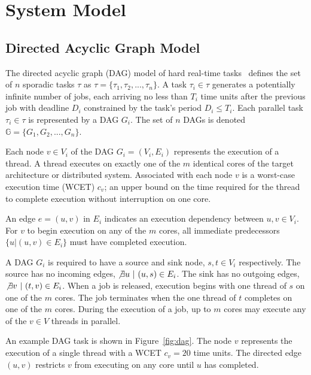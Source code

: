 \clearpage
\section{System Model}

\subsection{Directed Acyclic Graph Model}

The directed acyclic graph (DAG) model of hard real-time
tasks~\cite{li2014analysis} defines the set of ${n}$ sporadic tasks
${\tau}$ as ${\tau = \{\tau_1,\tau_2, ..., \tau_n\}}$. A task
${\tau_i \in \tau}$ generates a potentially infinite number
of jobs, each arriving no less than ${T_i}$ time units after the
previous job with deadline ${D_i}$ constrained by the task's period
${D_i \leq T_i}$. Each parallel task ${\tau_i \in \tau}$ is
represented by a DAG ${G_i}$. The set of ${n}$ DAGs is denoted
${\mathbb{G} = \{G_1, G_2, ..., G_n\}}$.

Each node ${v \in V_i}$ of the DAG ${G_i = (V_i, E_i)}$ represents the 
execution of a thread. A thread executes on exactly one of the ${m}$
identical cores of the target architecture or distributed
system. Associated with each node ${v}$ is a worst-case execution time 
(WCET) ${c_v}$; an upper bound on the time required for the thread to
complete execution without interruption on one core.

An edge ${e = (u,v)}$ in ${E_i}$ indicates an execution dependency
between ${u,v \in V_i}$. For ${v}$ to begin execution on any of the
${m}$ cores, all immediate predecessors ${\{u|(u,v) \in E_i\}}$ must
have completed execution.

A DAG ${G_i}$ is required to have a source and sink node,
${s,t \in V_i}$ respectively. The source has no incoming edges,
${\not \exists u~|~(u,s) \in E_i}$. The sink has no outgoing edges,
${\not \exists v~|~(t,v) \in E_i}$. When a job is released, execution
begins with one thread of ${s}$ on one of the ${m}$ cores. The job
terminates when the one thread of ${t}$ completes on one of the ${m}$
cores. During the execution of a job, up to ${m}$ cores may execute
any of the ${v \in V}$ threads in parallel.

An example DAG task is shown in Figure~\ref{fig:dag}. The node
${v}$ represents the execution of a single thread with a WCET
${c_v = 20}$ time units. The directed edge ${(u,v)}$ restricts ${v}$
from executing on any core until ${u}$ has completed.

